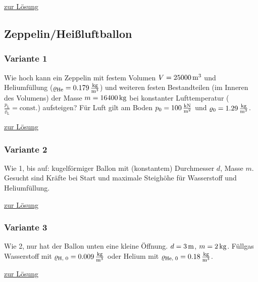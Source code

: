 \documentclass[a4paper]{scrartcl}
\begin{document}
\hyperref[lsg:WurfZug]{zur Lösung}

\subsection{Zeppelin/Heißluftballon}
\subsubsection{Variante 1}
\label{aufg:Zeppelin1}
Wie hoch kann ein Zeppelin mit festem Volumen $V = \unit[25000]{m^3}$ und Heliumfüllung ($\varrho_\text{He} = \unit[0.179]{\frac{kg}{m^3}}$) und weiteren festen Bestandteilen (im Inneren des Volumens) der Masse $m = \unit[16400]{kg}$ bei konstanter Lufttemperatur ($\frac{p_\text{L}}{\varrho_\text{L}} = \text{const.}$) aufsteigen? Für Luft gilt am Boden $p_0 = \unit[100]{\frac{kN}{m^2}}$ und $\varrho_0 = \unit[1.29]{\frac{kg}{m^3}}$.

\hyperref[lsg:Zeppelin1]{zur Lösung}

\subsubsection{Variante 2}
\label{aufg:Zeppelin2}
Wie 1, bis auf: kugelförmiger Ballon mit (konstantem) Durchmesser $d$, Masse $m$. Gesucht sind Kräfte bei Start und maximale Steighöhe für Wasserstoff und Heliumfüllung.

\hyperref[lsg:Zeppelin2]{zur Lösung}

\subsubsection{Variante 3}
\label{aufg:Zeppelin3}
Wie 2, nur hat der Ballon unten eine kleine Öffnung. $d = \unit[3]{m}$, $m=\unit[2]{kg}$. Füllgas Wasserstoff mit $\varrho_\text{H, 0} = \unit[0.009]{\frac{kg}{m^3}}$ oder Helium mit $\varrho_\text{He, 0} = \unit[0.18]{\frac{kg}{m^3}}$.

\hyperref[lsg:Zeppelin3]{zur Lösung}
\end{document}
